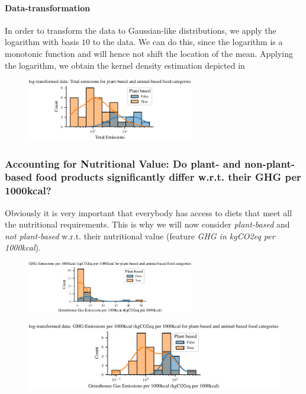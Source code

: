 \documentclass{article}
\begin{document}
\paragraph*{Data-transformation}
In order to transform the data to Gaussian-like distributions, we apply the logarithm with basis $10$ to the data. We can do this, since the logarithm is a monotonic function and will hence not shift the location of the mean. Applying the logarithm, we obtain the kernel density estimation depicted in  

\begin{figure}[h]
  \centering
  \includegraphics[width=0.65\textwidth]{figures/emissions-log.pdf}
  \label{fig:emissions-log}
\end{figure}


\subsubsection*{Accounting  for Nutritional Value: Do plant- and non-plant-based food products significantly differ w.r.t. their GHG per 1000kcal?}

Obviously it is very important that everybody has access to diets that meet all the nutritional requirements. This is why  we will now consider \textit{plant-based} and \textit{not plant-based} w.r.t. their nutritional value (feature \textit{GHG in kgCO2eq per 1000kcal}).



\begin{figure}[h]
  \centering
  \includegraphics[width=0.65\textwidth]{figures/ghg.pdf}
  \label{fig:emissions-log}
\end{figure}

\begin{figure}[h]
    \centering
    \includegraphics{figures/ghg-log.pdf}
    \label{fig:ghg-log}
\end{figure}
\end{document}
